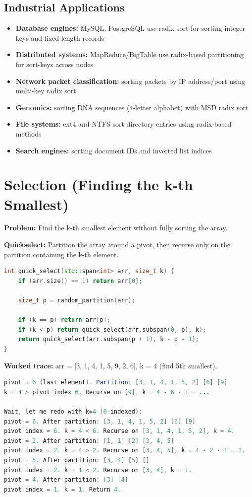\subsection{Industrial Applications}

\begin{itemize}
    \item \textbf{Database engines:} MySQL, PostgreSQL use radix sort for sorting integer keys and fixed-length records
    \item \textbf{Distributed systems:} MapReduce/BigTable use radix-based partitioning for sort-keys across nodes
    \item \textbf{Network packet classification:} sorting packets by IP address/port using multi-key radix sort
    \item \textbf{Genomics:} sorting DNA sequences (4-letter alphabet) with MSD radix sort
    \item \textbf{File systems:} ext4 and NTFS sort directory entries using radix-based methods
    \item \textbf{Search engines:} sorting document IDs and inverted list indices
\end{itemize}

\section{Selection (Finding the k-th Smallest)}

\textbf{Problem:} Find the k-th smallest element without fully sorting the array.

\textbf{Quickselect:} Partition the array around a pivot, then recurse only on the partition containing the k-th element.

\begin{lstlisting}[language=C++]
int quick_select(std::span<int> arr, size_t k) {
    if (arr.size() == 1) return arr[0];

    size_t p = random_partition(arr);

    if (k == p) return arr[p];
    if (k < p) return quick_select(arr.subspan(0, p), k);
    return quick_select(arr.subspan(p + 1), k - p - 1);
}
\end{lstlisting}

\textbf{Worked trace:} arr = [3, 1, 4, 1, 5, 9, 2, 6], k = 4 (find 5th smallest).

\begin{lstlisting}[language=Java]
pivot = 6 (last element). Partition: [3, 1, 4, 1, 5, 2] [6] [9]
k = 4 > pivot index 6. Recurse on [9], k = 4 - 6 - 1 = ... 

Wait, let me redo with k=4 (0-indexed):
pivot = 6. After partition: [3, 1, 4, 1, 5, 2] [6] [9]
pivot index = 6. k = 4 < 6. Recurse on [3, 1, 4, 1, 5, 2], k = 4.
pivot = 2. After partition: [1, 1] [2] [3, 4, 5]
pivot index = 2. k = 4 > 2. Recurse on [3, 4, 5], k = 4 - 2 - 1 = 1.
pivot = 5. After partition: [3, 4] [5] []
pivot index = 2. k = 1 < 2. Recurse on [3, 4], k = 1.
pivot = 4. After partition: [3] [4]
pivot index = 1. k = 1. Return 4.
\end{lstlisting}

